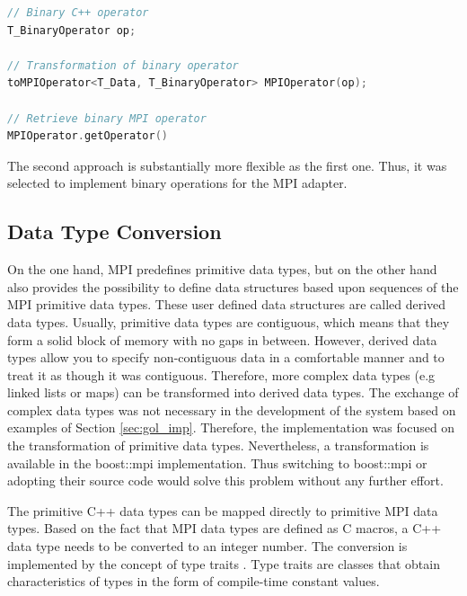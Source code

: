 \begin{minipage}[t]{\textwidth} 
\begin{lstlisting}[language=C++, caption={ }, label=lst:mpi_bin2]
// Binary C++ operator
T_BinaryOperator op;  
  
// Transformation of binary operator
toMPIOperator<T_Data, T_BinaryOperator> MPIOperator(op);

// Retrieve binary MPI operator
MPIOperator.getOperator()
\end{lstlisting}
\end{minipage}

\noindent The second approach is substantially more flexible as the
first one. Thus, it was selected to implement binary operations for the
MPI adapter.

\subsection{Data Type Conversion}
\label{sec:data_type_conversion}
On the one hand, MPI predefines primitive data types, but on the
other hand also provides the possibility to define data structures
based upon sequences of the MPI primitive data types. These user
defined data structures are called derived data types. Usually,
primitive data types are contiguous, which means that they form a
solid block of memory with no gaps in between. However, derived data
types allow you to specify non-contiguous data in a comfortable manner
and to treat it as though it was contiguous.  Therefore, more complex
data types (e.g linked lists or maps) can be transformed into derived
data types. The exchange of complex data types was not necessary in
the development of the system based on examples of Section
\ref{sec:gol_imp}. Therefore, the implementation was focused on the
transformation of primitive data types.  Nevertheless, a
transformation is available in the boost::mpi \cite{ref:boost_mpi}
implementation. Thus switching to boost::mpi or adopting their source
code would solve this problem without any further effort.

The primitive C++ data types can be mapped directly to primitive MPI
data types. Based on the fact that MPI data types are defined as C macros,
a C++ data type needs to be converted to an integer number. The
conversion is implemented by the concept of type traits
\cite{ref:type_trait}.  Type traits are classes that obtain
characteristics of types in the form of compile-time constant values.

